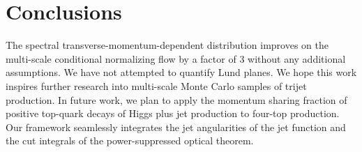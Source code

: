 \section{Conclusions}\label{sec:conclusions}

The spectral transverse-momentum-dependent distribution improves on the
multi-scale conditional normalizing flow by a factor of 3 without any
additional assumptions. We have not attempted to quantify Lund planes.
We hope this work inspires further research into multi-scale Monte Carlo
samples of trijet production. In future work, we plan to apply the
momentum sharing fraction of positive top-quark decays of Higgs plus jet
production to four-top production. Our framework seamlessly integrates
the jet angularities of the jet function and the cut integrals of the
power-suppressed optical theorem.

